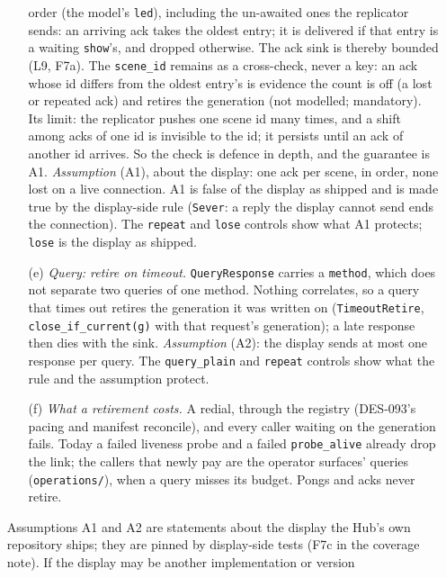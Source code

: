 \documentclass[a4paper,10pt,fleqn]{article}
\begin{document}
\begin{enumerate}
\begin{enumerate}
        order (the model's \texttt{led}), including the un-awaited ones the
        replicator sends: an arriving ack takes the oldest entry; it is
        delivered if that entry is a waiting \texttt{show}'s, and dropped
        otherwise.  The ack sink is thereby bounded (L9, F7a).  The
        \texttt{scene\_id} remains as a cross-check, never a key: an ack whose
        id differs from the oldest entry's is evidence the count is off
        (a lost or repeated ack) and retires the generation (not modelled;
        mandatory).  Its limit: the replicator pushes one scene id many times,
        and a shift among acks of one id is invisible to the id; it persists
        until an ack of another id arrives.  So the check is defence in depth, and the
        guarantee is A1.  \emph{Assumption} (A1), about the display: one ack
        per scene, in order, none lost on a live connection.  A1 is false of
        the display as shipped and is made true by the display-side rule
        (\texttt{Sever}: a reply the display cannot send ends the connection).
        The \texttt{repeat} and \texttt{lose} controls show what A1 protects;
        \texttt{lose} is the display as shipped.
      \item[(e)] \emph{Query: retire on timeout.}  \texttt{QueryResponse}
        carries a \texttt{method}, which does not separate two queries of one
        method.  Nothing correlates, so a query that times out retires the
        generation it was written on (\texttt{TimeoutRetire},
        \texttt{close\_if\_current(g)} with that request's generation); a
        late response then dies with the sink.  \emph{Assumption} (A2): the
        display sends at most one response per query.  The \texttt{query\_plain}
        and \texttt{repeat} controls show what the rule and the assumption
        protect.
      \item[(f)] \emph{What a retirement costs.}  A redial, through the registry
        (DES-093's pacing and manifest reconcile), and every caller waiting on
        the generation fails.  Today a failed liveness probe and a failed
        \texttt{probe\_alive} already drop the link; the callers that newly pay
        are the operator surfaces' queries (\texttt{operations/}), when
        a query misses its budget.  Pongs and acks never retire.
    \end{enumerate}
    Assumptions A1 and A2 are statements about the display the Hub's own
    repository ships; they are pinned by display-side tests (F7c in the
    coverage note).  If the display may be another implementation or version

\end{enumerate}
\end{document}
